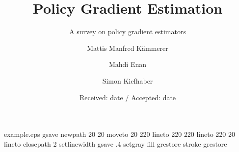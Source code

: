 \begin{filecontents*}{example.eps}
gsave
newpath
  20 20 moveto
  20 220 lineto
  220 220 lineto
  220 20 lineto
closepath
2 setlinewidth
gsave
  .4 setgray fill
grestore
stroke
grestore
\end{filecontents*}
\RequirePackage{fix-cm}
\documentclass[draft]{svjour3}
\smartqed
\usepackage[T1]{fontenc}
\usepackage[utf8]{inputenc}
\usepackage[final]{graphicx}
\graphicspath{ {./images/} }
\usepackage{amsmath,amssymb}
\usepackage[final]{hyperref}
\usepackage{tikz}
\usepackage{environ}
\usetikzlibrary{shapes,arrows,positioning,calc}


\title{Policy Gradient Estimation}
\subtitle{A survey on policy gradient estimators}

\author {Mattis Manfred K{\"a}mmerer \and Mahdi Enan \and Simon Kiefhaber}


\date{Received: date / Accepted: date}

\maketitle

\begin{abstract}
Policy gradient methods use a policy model to decide which actions maximize the expected accumulated reward received in a given environment. Policies can be deterministic but are often stochastic to accommodate for the nature of the given environment. One class of problems that is frequently chosen to evaluate these methods are continuous control problems. Depending on the environment the formal design of an optimal controller can be infeasible or very labor-intensive. Policy gradient methods can provide useful control models while aiming to optimize their data efficiency, thus requiring less resources for the learning process. The efficiency of these methods highly depends on the direction of change, i.e., the gradient they estimate. The goal of policy gradient estimation is to estimate a function that predicts how the policy should be changed to solve the reinforcement learning problem of maximizing the accumulated reward of an agent.  Thus, different functions for estimating the gradient have been proposed, some of which outperform others in specific areas. This survey gives a general introduction to policy gradient, and gives an overview of existing gradient estimation approaches. 

\end{abstract}

